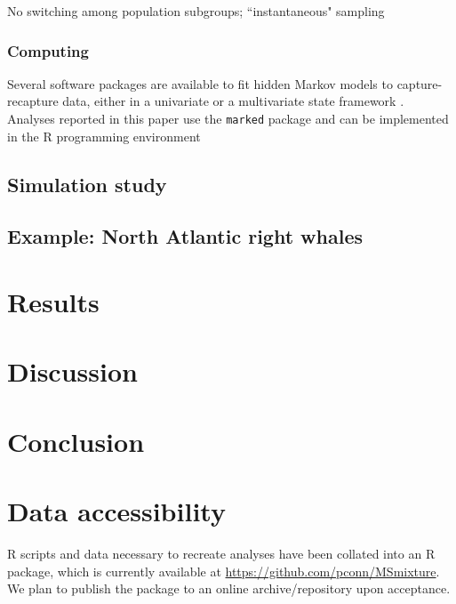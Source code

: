 \documentclass[times,mee,doublespace,]{besauth2}
\begin{document}
No switching among population subgroups; ``instantaneous" sampling

\subsubsection{Computing}

Several software packages are available to fit hidden Markov models to capture-recapture data, either in a univariate \citep[e.g. E-SURGE[]{ChoquetEtAl2009b)} or a multivariate state framework \citep[\texttt{marked}][]{LaakeEtAl2013,JohnsonEtAl2016}.  Analyses reported in this paper use the \texttt{marked} package and can be implemented in the R programming environment \citep{RTeam2015}

\subsection{Simulation study}

\subsection{Example: North Atlantic right whales}

\section{Results}

\section{Discussion}


\section{Conclusion}



\vspace{.3in}
\section{Data accessibility}
R scripts and data necessary to recreate analyses have been collated into an R package, which is currently available at \url{https://github.com/pconn/MSmixture}.  We plan to publish the package to an online archive/repository upon acceptance. \\
\end{document}

